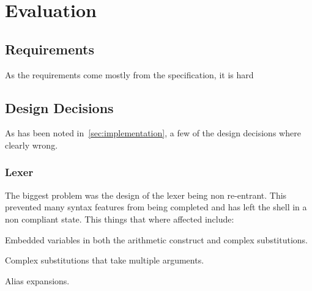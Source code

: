 \chapter{Evaluation}






\section{Requirements}
As the requirements come mostly from the specification, it is hard 


\section{Design Decisions}
As has been noted in~\ref{sec:implementation}, a few of the design decisions where clearly wrong.

\subsection{Lexer}
The biggest problem was the design of the lexer being non re-entrant.
This prevented many syntax features from being completed and has left the shell in a non compliant state.
This things that where affected include:
\begin{itemize*}
	\item Embedded variables in both the arithmetic construct and complex substitutions.
    \item Complex substitutions that take multiple arguments.
    \item Alias expansions.
\end{itemize*}

